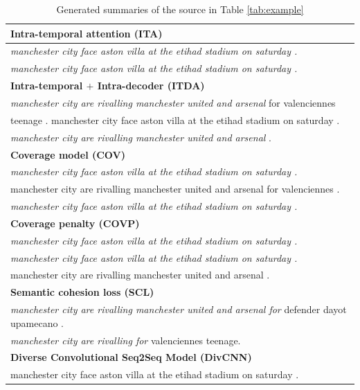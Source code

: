 \documentclass{nle}
\theoremstyle{definition}
\newcommand{\tabref}[1]{Table \ref{#1}}
\begin{document}
\begin{table}[th!]
	\begin{center}
		\caption{\label{tab:strong_methods} Generated summaries of the source in \tabref{tab:example}}
		\begin{tabular}{|l|}%
			
			\hline \bf Intra-temporal attention (ITA) \\
			\hline \textit{manchester city face aston villa at the etihad stadium on saturday .} \\
			\textit{manchester city face aston villa at the etihad stadium on saturday .}\\
			\hline \bf Intra-temporal $+$ Intra-decoder (ITDA) \\
			\hline \textit{manchester city are rivalling manchester united and arsenal }for valenciennes\\
			teenage . manchester city face aston villa at the etihad stadium on saturday . \\
			\textit{manchester city are rivalling manchester united and arsenal }. \\
			\hline \bf Coverage model (COV) \\
			\hline \textit{manchester city face aston villa at the etihad stadium on saturday .} \\
			manchester city are rivalling manchester united and arsenal for valenciennes . \\
			\textit{manchester city face aston villa at the etihad stadium on saturday .}\\
			\hline \bf Coverage penalty (COVP)\\
			\hline \textit{manchester city face aston villa at the etihad stadium on saturday .}\\
			\textit{manchester city face aston villa at the etihad stadium on saturday .}\\
			manchester city are rivalling manchester united and arsenal .\\
			\hline \bf Semantic cohesion loss (SCL) \\
			\hline \textit{manchester city are rivalling manchester united and arsenal for } defender dayot upamecano . \\
			\textit{manchester city are rivalling for} valenciennes teenage. \\
			\hline \bf Diverse Convolutional Seq2Seq  Model (DivCNN) \\
			\hline manchester city face aston villa at the etihad stadium on saturday . \\

\end{tabular}
\end{center}
\end{table}
\end{document}
